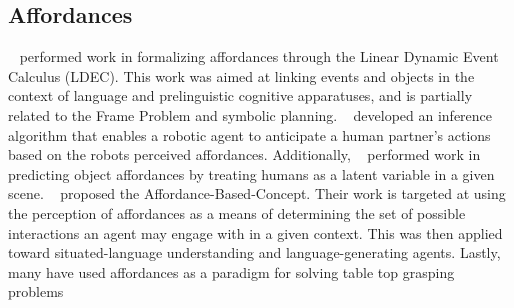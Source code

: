 \documentclass[]{article}
\newcommand{\dnote}[1]{\textcolor{Orange}{\textbf{D: #1}}}
\begin{document}
\subsection{Affordances}
~\citep{steedman02} performed work in formalizing affordances through the Linear Dynamic Event Calculus (LDEC). This work was aimed at linking events and objects in the context of language and prelinguistic cognitive apparatuses, and is partially related to the Frame Problem and symbolic planning. ~\citep{koppula13a} developed an inference algorithm that enables a robotic agent to anticipate a human partner's actions based on the robots perceived affordances. Additionally, ~\citep{koppula13c} performed work in predicting object affordances by treating humans as a latent variable in a given scene. ~\citep{gorniak05} proposed the Affordance-Based-Concept. Their work is targeted at
 using the perception of affordances as a means of determining the set of possible interactions an agent may engage with in a given context.
This was then applied toward situated-language understanding and language-generating agents. Lastly, many have used affordances as a paradigm for solving table top grasping problems ~\citep{pas13,sweeney07,detry09,montesano09}

\end{document}
